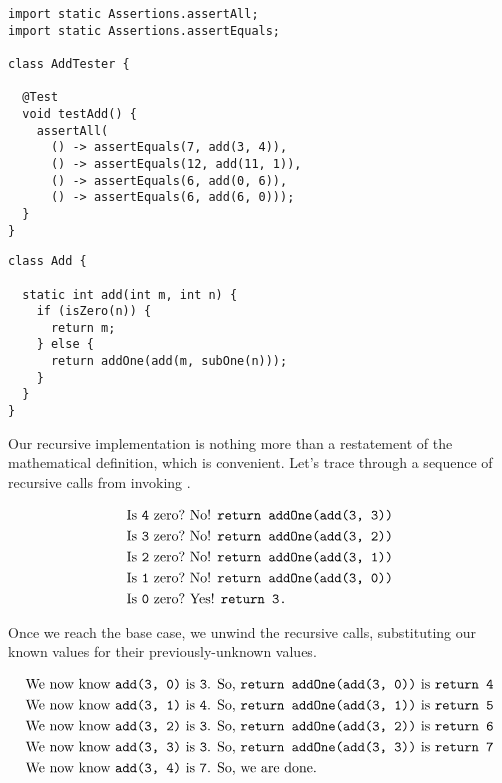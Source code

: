 \begin{lstlisting}[language=MyJava]
import static Assertions.assertAll;
import static Assertions.assertEquals;

class AddTester {
  
  @Test
  void testAdd() {
    assertAll(
      () -> assertEquals(7, add(3, 4)),
      () -> assertEquals(12, add(11, 1)),
      () -> assertEquals(6, add(0, 6)),
      () -> assertEquals(6, add(6, 0)));
  }
}
\end{lstlisting}

\begin{lstlisting}[language=MyJava]
class Add {

  static int add(int m, int n) {
    if (isZero(n)) { 
      return m;
    } else {
      return addOne(add(m, subOne(n)));
    }
  }
}
\end{lstlisting}

Our recursive implementation is nothing more than a restatement of the mathematical definition, which is convenient. 
Let's trace through a sequence of recursive calls from invoking .

\begin{align*}
    \text{Is }\texttt{4} \text{ zero?} &\text{ No! }\texttt{return addOne(add(3, 3))}\\
    \text{Is }\texttt{3} \text{ zero?} &\text{ No! }\texttt{return addOne(add(3, 2))}\\
    \text{Is }\texttt{2} \text{ zero?} &\text{ No! }\texttt{return addOne(add(3, 1))}\\
    \text{Is }\texttt{1} \text{ zero?} &\text{ No! }\texttt{return addOne(add(3, 0))}\\
    \text{Is }\texttt{0} \text{ zero?} &\text{ Yes! }\texttt{return 3.}
\end{align*}

Once we reach the base case, we unwind the recursive calls, substituting our known values for their previously-unknown values.

\begin{align*}
    \text{We now know }\texttt{add(3, 0)} \text{ is }\texttt{3}\text{. So, } &\texttt{return addOne(add(3, 0))} \text{ is } \texttt{return 4}\\
    \text{We now know }\texttt{add(3, 1)} \text{ is }\texttt{4}\text{. So, } &\texttt{return addOne(add(3, 1))} \text{ is } \texttt{return 5}\\
    \text{We now know }\texttt{add(3, 2)} \text{ is }\texttt{3}\text{. So, } &\texttt{return addOne(add(3, 2))} \text{ is } \texttt{return 6}\\
    \text{We now know }\texttt{add(3, 3)} \text{ is }\texttt{3}\text{. So, } &\texttt{return addOne(add(3, 3))} \text{ is } \texttt{return 7}\\
    \text{We now know }\texttt{add(3, 4)} \text{ is }\texttt{7}\text{. So, } &\text{we are done.} 
\end{align*}


